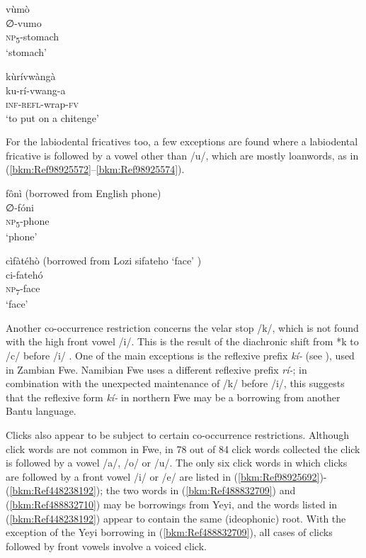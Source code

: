 \ea
\glll vùmò\\
∅-vumo\\
\textsc{np}\textsubscript{5}-stomach\\
\glt ‘stomach’
\z

\ea
\label{bkm:Ref98515164}
\glll kùrívwàngà\\
ku-rí-vwang-a\\
\textsc{inf}-\textsc{refl}-wrap-\textsc{fv}\\
\glt ‘to put on a chitenge’
\z

For the labiodental fricatives too, a few exceptions are found where a labiodental fricative is fol\-lowed by a vowel other than /u/, which are mostly loanwords, as in (\ref{bkm:Ref98925572}--\ref{bkm:Ref98925574}).

\ea
\label{bkm:Ref98925572}
fônì (borrowed from English phone)\\
∅-fóni\\
\textsc{np}\textsubscript{5}-phone\\
\glt ‘phone’
\z

\ea
\label{bkm:Ref98925574}
cìfàtéhò (borrowed from Lozi \-sifateho ‘face’ \citep[54]{Burger1960})\\
ci-fatehó\\
\textsc{np}\textsubscript{7}-face\\
\glt ‘face’
\z

Another co-occurrence restriction concerns the velar stop /k/, which is not found with the high front vowel /i/. This is the result of the diachronic shift from *k to /c/ before /i/ \citep[118-119]{Bostoen2009}. One of the main exceptions is the reflexive prefix \textit{kí\nobreakdash-} (see ), used in Zambian Fwe. Namibian Fwe uses a different reflexive prefix \textit{rí-}; in combination with the unexpected maintenance of /k/ before /i/, this suggests that the reflexive form \textit{kí-} in northern Fwe may be a borrowing from another Bantu language.

Clicks also appear to be subject to certain co-occurrence restrictions. Although click words are not common in Fwe, in 78 out of 84 click words collected the click is followed by a vowel /a/, /o/ or /u/. The only six click words in which clicks are followed by a front vowel /i/ or /e/ are listed in (\ref{bkm:Ref98925692})- (\ref{bkm:Ref448238192}); the two words in (\ref{bkm:Ref488832709}) and (\ref{bkm:Ref488832710}) may be borrowings from Yeyi, and the words listed in (\ref{bkm:Ref448238192}) appear to contain the same (ideophonic) root. With the exception of the Yeyi borrowing in (\ref{bkm:Ref488832709}), all cases of clicks followed by front vowels involve a voiced click.

